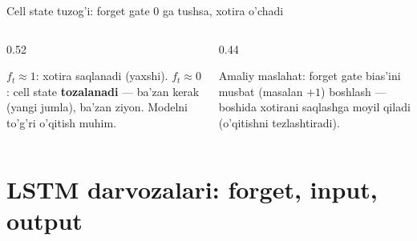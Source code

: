 \documentclass[aspectratio=169,11pt]{beamer}
\begin{document}
\begin{frame}{Cell state tuzog'i: forget gate $0$ ga tushsa, xotira o'chadi}
  \begin{columns}[T]
    \begin{column}{0.52\textwidth}
      \begin{tcolorbox}[warnbox,title=Forget gate ikki yoqlama]
        \small
        $f_t\approx 1$: xotira saqlanadi (yaxshi). $f_t\approx 0$: cell state
        \textbf{tozalanadi} --- ba'zan kerak (yangi jumla), ba'zan ziyon.
        Modelni to'g'ri o'qitish muhim.
      \end{tcolorbox}
    \end{column}
    \begin{column}{0.44\textwidth}
      \begin{tcolorbox}[okbox,top=2pt,bottom=2pt]
        \footnotesize
        Amaliy maslahat: forget gate bias'ini musbat (masalan $+1$) boshlash ---
        boshida xotirani saqlashga moyil qiladi (o'qitishni tezlashtiradi).
      \end{tcolorbox}
    \end{column}
  \end{columns}
\end{frame}

\section[LSTM]{LSTM darvozalari: forget, input, output}
\end{document}
